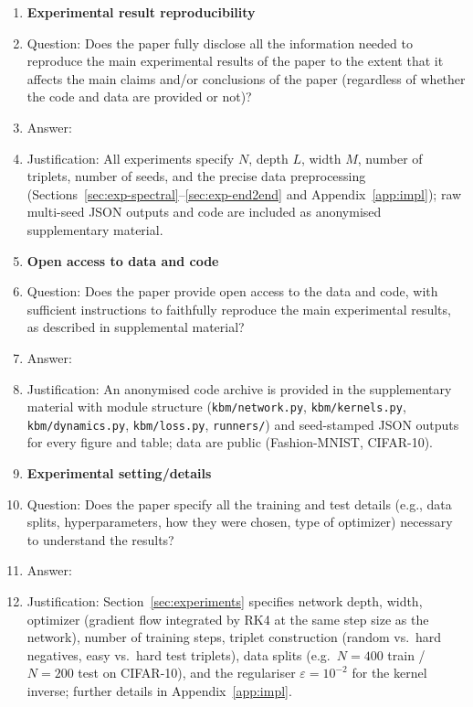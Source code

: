 \begin{enumerate}
    \item {\bf Experimental result reproducibility}
    \item[] Question: Does the paper fully disclose all the information needed to reproduce the main experimental results of the paper to the extent that it affects the main claims and/or conclusions of the paper (regardless of whether the code and data are provided or not)?
    \item[] Answer: \answerYes{}
    \item[] Justification: All experiments specify $N$, depth $L$, width $M$, number of triplets, number of seeds, and the precise data preprocessing (Sections~\ref{sec:exp-spectral}--\ref{sec:exp-end2end} and Appendix~\ref{app:impl}); raw multi-seed JSON outputs and code are included as anonymised supplementary material.

\item {\bf Open access to data and code}
    \item[] Question: Does the paper provide open access to the data and code, with sufficient instructions to faithfully reproduce the main experimental results, as described in supplemental material?
    \item[] Answer: \answerYes{}
    \item[] Justification: An anonymised code archive is provided in the supplementary material with module structure (\texttt{kbm/network.py}, \texttt{kbm/kernels.py}, \texttt{kbm/dynamics.py}, \texttt{kbm/loss.py}, \texttt{runners/}) and seed-stamped JSON outputs for every figure and table; data are public (Fashion-MNIST, CIFAR-10).

\item {\bf Experimental setting/details}
    \item[] Question: Does the paper specify all the training and test details (e.g., data splits, hyperparameters, how they were chosen, type of optimizer) necessary to understand the results?
    \item[] Answer: \answerYes{}
    \item[] Justification: Section~\ref{sec:experiments} specifies network depth, width, optimizer (gradient flow integrated by RK4 at the same step size as the network), number of training steps, triplet construction (random vs.\ hard negatives, easy vs.\ hard test triplets), data splits (e.g.\ $N=400$ train / $N=200$ test on CIFAR-10), and the regulariser $\varepsilon=10^{-2}$ for the kernel inverse; further details in Appendix~\ref{app:impl}.


\end{enumerate}
